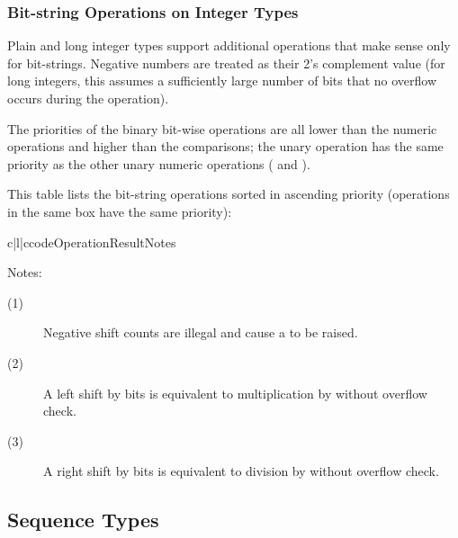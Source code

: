 \subsubsection{Bit-string Operations on Integer Types \label{bitstring-ops}}

Plain and long integer types support additional operations that make
sense only for bit-strings.  Negative numbers are treated as their 2's
complement value (for long integers, this assumes a sufficiently large
number of bits that no overflow occurs during the operation).

The priorities of the binary bit-wise operations are all lower than
the numeric operations and higher than the comparisons; the unary
operation \samp{\~} has the same priority as the other unary numeric
operations (\samp{+} and \samp{-}).

This table lists the bit-string operations sorted in ascending
priority (operations in the same box have the same priority):

\begin{tableiii}{c|l|c}{code}{Operation}{Result}{Notes}
  \hline
\end{tableiii}

\noindent
Notes:
\begin{description}
\item[(1)] Negative shift counts are illegal and cause a
 to be raised.
\item[(2)] A left shift by  bits is equivalent to
multiplication by  without overflow check.
\item[(3)] A right shift by  bits is equivalent to
division by  without overflow check.
\end{description}


\subsection{Sequence Types \label{typesseq}}

